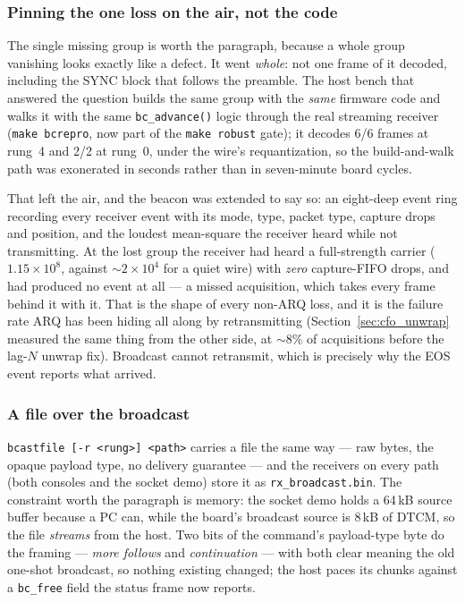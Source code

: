 \subsubsection*{Pinning the one loss on the air, not the code}

The single missing group is worth the paragraph, because a whole group
vanishing looks exactly like a defect. It went \emph{whole}: not one
frame of it decoded, including the SYNC block that follows the
preamble. The host bench that answered the question builds the same
group with the \emph{same} firmware code and walks it with the same
\texttt{bc\_advance()} logic through the real streaming receiver
(\texttt{make bcrepro}, now part of the \texttt{make robust} gate); it
decodes 6/6 frames at rung~4 and 2/2 at rung~0, under the wire's
requantization, so the build-and-walk path was exonerated in seconds
rather than in seven-minute board cycles.

That left the air, and the beacon was extended to say so: an eight-deep
event ring recording every receiver event with its mode, type, packet
type, capture drops and position, and the loudest mean-square the
receiver heard while not transmitting. At the lost group the receiver
had heard a full-strength carrier ($1.15\times10^{8}$, against
$\sim$$2\times10^{4}$ for a quiet wire) with \emph{zero} capture-FIFO
drops, and had produced no event at all --- a missed acquisition, which
takes every frame behind it with it. That is the shape of every non-ARQ
loss, and it is the failure rate ARQ has been hiding all along by
retransmitting (Section~\ref{sec:cfo_unwrap} measured the same
thing from the other side, at $\sim$8\% of acquisitions before the
lag-$N$ unwrap fix). Broadcast cannot retransmit, which is precisely
why the EOS event reports what arrived.

\subsubsection*{A file over the broadcast}

\texttt{bcastfile [-r <rung>] <path>} carries a file the same way ---
raw bytes, the opaque payload type, no delivery guarantee --- and the
receivers on every path (both consoles and the socket demo) store it
as \texttt{rx\_broadcast.bin}. The constraint worth the paragraph is
memory: the socket demo holds a 64\,kB source buffer because a PC
can, while the board's broadcast source is 8\,kB of DTCM, so the file
\emph{streams} from the host. Two bits of the command's payload-type
byte do the framing --- \emph{more follows} and \emph{continuation}
--- with both clear meaning the old one-shot broadcast, so nothing
existing changed; the host paces its chunks against a
\texttt{bc\_free} field the status frame now reports.

